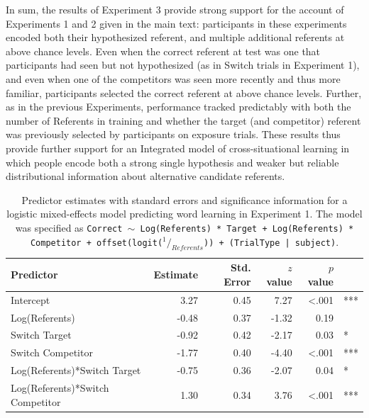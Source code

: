 \documentclass[man,floatsintext]{apa6}
\begin{document}
In sum, the results of Experiment 3 provide strong support for the account of Experiments 1 and 2 given in the main text: participants in these experiments encoded both their hypothesized referent, and multiple additional referents at above chance levels. Even when the correct referent at test was one that participants had seen but not hypothesized (as in Switch trials in Experiment 1), and even when one of the competitors was seen more recently and thus more familiar, participants selected the correct referent at above chance levels. Further, as in the previous Experiments, performance tracked predictably with both the number of Referents in training and whether the target (and competitor) referent was previously selected by participants on exposure trials. These results thus provide further support for an Integrated model of cross-situational learning in which people encode both a strong single hypothesis and weaker but reliable distributional information about alternative candidate referents. 

\begin{table}[t]
\begin{center}
\begin{tabular}{lrrrrl}
 Predictor & Estimate & Std. Error & $z$ value & $p$ value &  \\ 
  \hline
  Intercept & 3.27 & 0.45 & 7.27 & <.001 & *** \\ 
  Log(Referents) & -0.48 & 0.37 & -1.32 & 0.19 &  \\ 
  Switch Target & -0.92 & 0.42 & -2.17 & 0.03 & * \\ 
  Switch Competitor & -1.77 & 0.40 & -4.40 & <.001 & *** \\ 
  Log(Referents)*Switch Target & -0.75 & 0.36 & -2.07 & 0.04 & * \\ 
  Log(Referents)*Switch Competitor & 1.30 & 0.34 & 3.76 & <.001 & *** \\ 
   \hline
\end{tabular}
\label{tab:exp3_reg}\end{center}
\vspace{6pt}
\caption{\label{tab:exp3_reg}Predictor estimates with standard errors and significance information for a logistic mixed-effects model predicting word learning in Experiment 1. The model was specified as \small{\tt{Correct $\sim$ Log(Referents) * Target + Log(Referents) * Competitor + offset(logit($^1/_{Referents}$)) + (TrialType | subject)}}.}
\end{table}



\end{document}
